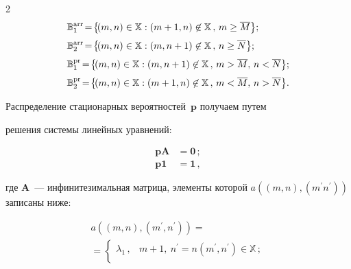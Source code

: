 \begin{multicols}{2}
  \begin{align*}


&  \mathbb{B}_1^{\mathrm{arr}}\!=\!\left\{\! (m,n)\in \mathbb{X}: 


(m+1,n)\not\in\mathbb{X}\,,\,m\geq \overline{M}\right\}\!;\\[3pt]


&  \mathbb{B}_2^{\mathrm{arr}}\!=\!\left\{\! (m,n)\in \mathbb{X}: 


(m, n+1)\not\in\mathbb{X}\,,\,n\geq \overline{N}\right\}\!;\\[3pt]


&  \mathbb{B}_1^{\mathrm{pr}}\!=\!\left\{\! (m,n)\in \mathbb{X}: 


(m,n+1)\not\in\mathbb{X}\,,\,m>\overline{M},\,n<\overline{N}\right\}\!;\\[3pt] \hspace*{-.3pt}


&\mathbb{B}_2^{\mathrm{pr}}\!=\!\left\{\! (m,n)\in \mathbb{X}: 


(m+1,n)\not\in\mathbb{X}\,,\,m<\overline{M},\,n>\overline{N}\right\}\!. \hspace*{-.3pt}


\end{align*}





Распределение стационарных вероятностей~$\mathbf{p}$ получаем путем 


решения системы линейных уравнений:


\begin{align*}


\mathbf{pA} &=\mathbf{0}\,;\\


\mathbf{p1} &=\mathbf{1}\,,


\end{align*}


где $\mathbf{A}$~--- инфинитезимальная матрица, элементы которой $a\left( 


(m,n),(m^\prime n^\prime)\right)$ записаны ниже:


\begin{multline*}


 a\left( (m,n), \left( m^\prime,n^\prime\right)\right) ={}\\


{}=\! 


\begin{cases}


\lambda_1\,,  & m+1,\ n^\prime=n\left( m^\prime, n^\prime\right)\in \mathbb{X}\,;\\[3pt]



\end{cases}
\end{multline*}
\end{multicols}
